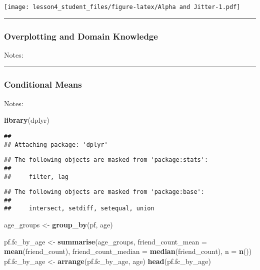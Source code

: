 \documentclass[]{article}
\newenvironment{Shaded}{\begin{snugshade}}{\end{snugshade}}
\newcommand{\KeywordTok}[1]{\textcolor[rgb]{0.13,0.29,0.53}{\textbf{#1}}}
\newcommand{\DataTypeTok}[1]{\textcolor[rgb]{0.13,0.29,0.53}{#1}}
\newcommand{\StringTok}[1]{\textcolor[rgb]{0.31,0.60,0.02}{#1}}
\newcommand{\NormalTok}[1]{#1}
\begin{document}
\texttt{[image: lesson4\_student\_files/figure-latex/Alpha and Jitter-1.pdf]}

\begin{center}\rule{0.5\linewidth}{\linethickness}\end{center}

\subsubsection{Overplotting and Domain
Knowledge}\label{overplotting-and-domain-knowledge}

Notes:

\begin{center}\rule{0.5\linewidth}{\linethickness}\end{center}

\subsubsection{Conditional Means}\label{conditional-means}

Notes:

\begin{Shaded}
\begin{Highlighting}[]
\KeywordTok{library}\NormalTok{(dplyr)}
\end{Highlighting}
\end{Shaded}

\begin{verbatim}
## 
## Attaching package: 'dplyr'
\end{verbatim}

\begin{verbatim}
## The following objects are masked from 'package:stats':
## 
##     filter, lag
\end{verbatim}

\begin{verbatim}
## The following objects are masked from 'package:base':
## 
##     intersect, setdiff, setequal, union
\end{verbatim}

\begin{Shaded}
\begin{Highlighting}[]
\NormalTok{age_groups <-}\StringTok{ }\KeywordTok{group_by}\NormalTok{(pf, age)}

\NormalTok{pf.fc_by_age <-}\StringTok{ }\KeywordTok{summarise}\NormalTok{(age_groups,}
                          \DataTypeTok{friend_count_mean =} \KeywordTok{mean}\NormalTok{(friend_count),}
                          \DataTypeTok{friend_count_median =} \KeywordTok{median}\NormalTok{(friend_count),}
                          \DataTypeTok{n =} \KeywordTok{n}\NormalTok{())}
\NormalTok{pf.fc_by_age <-}\StringTok{ }\KeywordTok{arrange}\NormalTok{(pf.fc_by_age, age)}
\KeywordTok{head}\NormalTok{(pf.fc_by_age)}
\end{Highlighting}
\end{Shaded}
\end{document}
